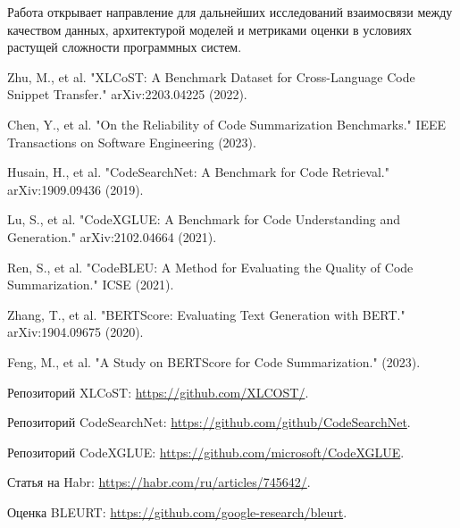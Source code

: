 \documentclass[14pt]{article}
\theoremstyle{definition}
\begin{document}
Работа открывает направление для дальнейших исследований взаимосвязи между качеством данных, архитектурой моделей и метриками оценки в условиях растущей сложности программных систем.





\newpage
{}
\begin{thebibliography}{99}

Zhu, M., et al. "XLCoST: A Benchmark Dataset for Cross-Language Code Snippet Transfer." arXiv:2203.04225 (2022).

Chen, Y., et al. "On the Reliability of Code Summarization Benchmarks." IEEE Transactions on Software Engineering (2023).

Husain, H., et al. "CodeSearchNet: A Benchmark for Code Retrieval." arXiv:1909.09436 (2019).

Lu, S., et al. "CodeXGLUE: A Benchmark for Code Understanding and Generation." arXiv:2102.04664 (2021).

Ren, S., et al. "CodeBLEU: A Method for Evaluating the Quality of Code Summarization." ICSE (2021).

Zhang, T., et al. "BERTScore: Evaluating Text Generation with BERT." arXiv:1904.09675 (2020).

Feng, M., et al. "A Study on BERTScore for Code Summarization." (2023).

Репозиторий XLCoST: \url{https://github.com/XLCOST/}.

Репозиторий CodeSearchNet: \url{https://github.com/github/CodeSearchNet}.

Репозиторий CodeXGLUE: \url{https://github.com/microsoft/CodeXGLUE}.

Статья на Habr: \url{https://habr.com/ru/articles/745642/}.

Оценка BLEURT: \url{https://github.com/google-research/bleurt}.

\end{thebibliography}
\end{document}
